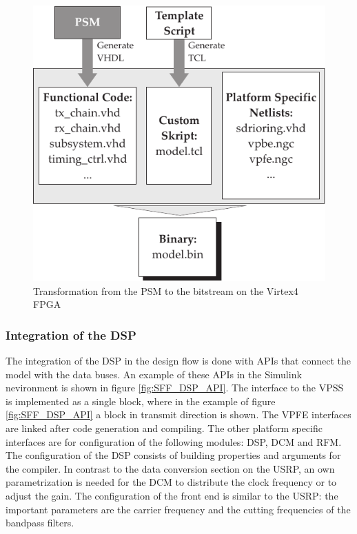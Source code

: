 \begin{figure}[htbp]
	\centering
		\includegraphics{../kapitel03/figures/codegener_FPGA_SFF_SDR.pdf}
	\caption{Transformation from the \ac{PSM} to the bitstream on the Virtex4 FPGA}
	\label{fig:codegener_FPGA_SFF_SDR}
\end{figure}


\subsubsection{Integration of the DSP}

The integration of the \ac{DSP} in the design flow is done with APIs that connect the model with the data buses. An example of these APIs in the Simulink nevironment is shown in figure \ref{fig:SFF_DSP_API}. The interface to the \ac{VPSS} is implemented as a single block, where in the example of figure \ref{fig:SFF_DSP_API} a block in transmit direction is shown. The \ac{VPFE} interfaces are linked after code generation and compiling. The other platform specific interfaces are for configuration of the following modules: DSP, \ac{DCM} and \ac{RFM}. The configuration of the \ac{DSP} consists of building properties and arguments for the compiler. In contrast to the data conversion section on the \ac{USRP}, an own parametrization is needed for the \ac{DCM} to distribute the clock frequency or to adjust the gain. The configuration of the front end is similar to the USRP: the important parameters are the carrier frequency and the cutting frequencies of the bandpass filters. 

